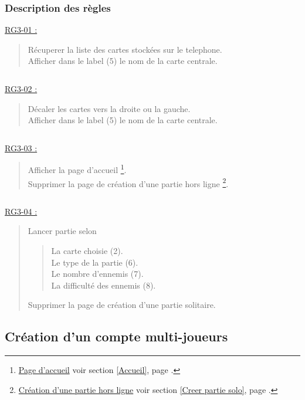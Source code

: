 \documentclass{report}
\begin{document}
\newpage
			
		\subsubsection{Description des règles}

			\underline{RG3-01 :}
				\begin{quote}
					Récuperer la liste des cartes stockées sur le telephone.\\
					Afficher dans le label (5) le nom de la carte centrale.
				\end{quote}
			
			$\,$
				
			\underline{RG3-02 :}
				\begin{quote}
					Décaler les cartes vers la droite ou la gauche.\\
					Afficher dans le label (5) le nom de la carte centrale.
				\end{quote}

			$\,$

			\underline{RG3-03 :}
				\begin{quote}
					Afficher la page d'accueil%
						\footnote[1]{
							\hyperlink{Page d'accueil}{Page d'accueil}
							\og voir section \ref{Accueil}, page \pageref{Accueil}.\fg
						}.\\
					Supprimer la page de création d'une partie hors ligne
					\footnote[2]{
						\hyperlink{Creer partie solo}{Création d'une partie hors ligne}
						\og voir section \ref{Creer partie solo}, page \pageref{Creer partie solo}.\fg
					}.
				\end{quote}

			$\,$

			\underline{RG3-04 :}
				\begin{quote}
					 Lancer partie selon
					 \begin{quote}
					 	La carte choisie (2).\\
					 	Le type de la partie (6).\\
					 	Le nombre d'ennemis (7).\\
					 	La difficulté des ennemis (8).
					 \end{quote}
					 Supprimer la page de création d'une partie solitaire.
				\end{quote}	


\newpage

	\subsection{Création d'un compte multi-joueurs}
	
\end{document}
